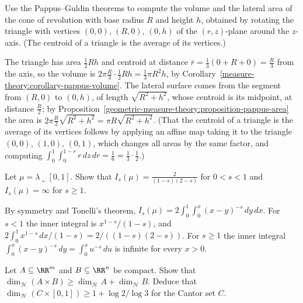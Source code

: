 \begin{exercise}\label{geometric-measure-theory:exercise-pappus-cone}
Use the Pappus--Guldin theorems to compute the volume and the lateral area of the cone of revolution with base radius $R$ and height $h$, obtained by rotating the triangle with vertices $(0, 0)$, $(R, 0)$,
$(0, h)$ of the $(r, z)$-plane around the $z$-axis. (The centroid of a triangle is the average of its vertices.)
\end{exercise}

\begin{solution}
The triangle has area $\frac12Rh$ and centroid at distance $\bar r = \frac13(0 + R + 0) = \frac R3$ from the axis, so the volume is $2\pi\frac R3 \cdot \frac12Rh = \frac13\pi R^2h$, by
Corollary~\ref{measure-theory:corollary-pappus-volume}. The lateral surface comes from the segment from $(R, 0)$ to $(0, h)$, of length $\sqrt{R^2 + h^2}$, whose centroid is its midpoint, at distance $\frac R2$; by
Proposition~\ref{geometric-measure-theory:proposition-pappus-area} the area is $2\pi\frac R2\sqrt{R^2 + h^2} = \pi R\sqrt{R^2 + h^2}$. (That the centroid of a triangle is the average of its vertices follows by applying an affine map
taking it to the triangle $(0, 0)$, $(1, 0)$, $(0, 1)$, which changes all areas by the same factor, and computing $\int_0^1\int_0^{1-r}r\,dz\,dr = \frac16 = \frac13 \cdot \frac12$.)
\end{solution}

\begin{exercise}\label{geometric-measure-theory:exercise-energy-interval}
Let $\mu = \lambda\llcorner[0, 1]$. Show that $I_s(\mu) = \frac{2}{(1 - s)(2 - s)}$ for $0 < s < 1$ and $I_s(\mu) = \infty$ for $s \geq 1$.
\end{exercise}

\begin{solution}
By symmetry and Tonelli's theorem, $I_s(\mu) = 2\int_0^1\int_0^x(x - y)^{-s}\,dy\,dx$. For $s < 1$ the inner integral is $x^{1-s}/(1 - s)$, and $2\int_0^1x^{1-s}\,dx/(1 - s) = 2/((1 - s)(2 - s))$. For
$s \geq 1$ the inner integral $\int_0^x(x - y)^{-s}\,dy = \int_0^xu^{-s}\,du$ is infinite for every $x > 0$.
\end{solution}

\begin{exercise}\label{geometric-measure-theory:exercise-product-dimension}
Let $A \subseteq \RR^m$ and $B \subseteq \RR^n$ be compact. Show that $\dim_{\mathcal{H}}(A \times B) \geq \dim_{\mathcal{H}}A + \dim_{\mathcal{H}}B$. Deduce that
$\dim_{\mathcal{H}}(C \times [0, 1]) \geq 1 + \log 2/\log 3$ for the Cantor set $C$.
\end{exercise}

